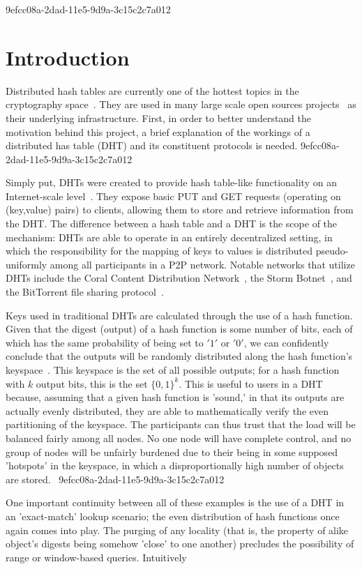 \documentclass[12pt]{article}
\begin{document}
9efcc08a-2dad-11e5-9d9a-3c15c2c7a012\section{Introduction}
\par Distributed hash tables are currently one of the hottest topics in the cryptography space~\cite{Stoica:2001dj,Rowstron:2001ea,Ratnasamy:2001wn}. They are used in many large scale open sources projects~\cite{Freitas:2013tb,Xu:2010vs,Perfitt:2010fh} as their underlying infrastructure. First, in order to better understand the motivation behind this project, a brief explanation of the workings of a distributed has table (DHT) and its constituent protocols is needed.
9efcc08a-2dad-11e5-9d9a-3c15c2c7a012
\par Simply put, DHTs were created to provide hash table-like functionality on an Internet-scale level~\cite{Ratnasamy:2001wn}. They expose basic PUT and GET requests (operating on (key,value) pairs) to clients, allowing them to store and retrieve information from the DHT. The difference between a hash table and a DHT is the scope of the mechanism: DHTs are able to operate in an entirely decentralized setting, in which the responsibility for the mapping of keys to values is distributed pseudo-uniformly among all participants in a P2P network. Notable networks that utilize DHTs include the Coral Content Distribution Network~\cite{Freedman:2004vb}, the Storm Botnet~\cite{Holz:2008uk}, and the BitTorrent file sharing protocol~\cite{Cohen:y1_8mBnw}.

\par Keys used in traditional DHTs are calculated through the use of a hash function. Given that the digest (output) of a hash function is some number of bits, each of which has the same probability of being set to $'1'$ or $'0'$, we can confidently conclude that the outputs will be randomly distributed along the hash function's keyspace~. This keyspace is the set of all possible outputs; for a hash function with $k$ output bits, this is the set $\{0,1\}^k$. This is useful to users in a DHT because, assuming that a given hash function is 'sound,' in that its outputs are actually evenly distributed, they are able to mathematically verify the even partitioning of the keyspace. The participants can thus trust that the load will be balanced fairly among all nodes. No one node will have complete control, and no group of nodes will be unfairly burdened due to their being in some supposed 'hotspots' in the keyspace, in which a disproportionally high number of objects are stored.~
9efcc08a-2dad-11e5-9d9a-3c15c2c7a012
\par One important continuity between all of these examples is the use of a DHT in an 'exact-match' lookup scenario; the even distribution of hash functions once again comes into play. The purging of any locality (that is, the property of alike object's digests being somehow 'close' to one another) precludes the possibility of range or window-based queries. Intuitively
\end{document}
